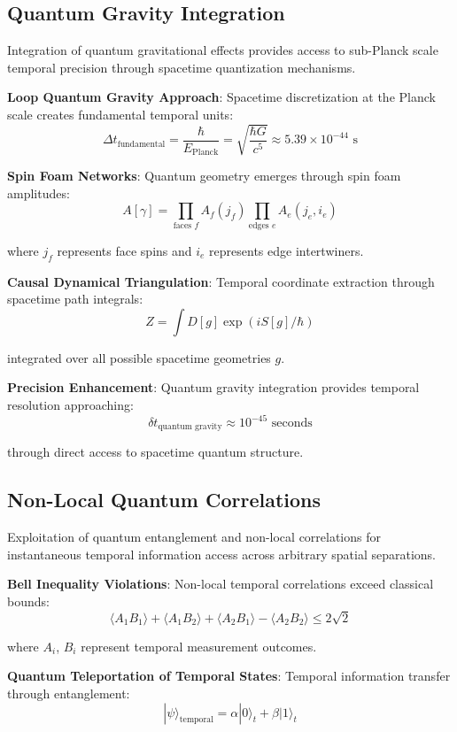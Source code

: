 \documentclass[12pt,a4paper]{article}
\begin{document}
\subsection{Quantum Gravity Integration}

Integration of quantum gravitational effects provides access to sub-Planck scale temporal precision through spacetime quantization mechanisms.

\textbf{Loop Quantum Gravity Approach}: Spacetime discretization at the Planck scale creates fundamental temporal units:
$$\Delta t_{\text{fundamental}} = \frac{\hbar}{E_{\text{Planck}}} = \sqrt{\frac{\hbar G}{c^5}} \approx 5.39 \times 10^{-44} \text{ s}$$

\textbf{Spin Foam Networks}: Quantum geometry emerges through spin foam amplitudes:
$$A[\gamma] = \prod_{\text{faces } f} A_f(j_f) \prod_{\text{edges } e} A_e(j_e,i_e)$$

where $j_f$ represents face spins and $i_e$ represents edge intertwiners.

\textbf{Causal Dynamical Triangulation}: Temporal coordinate extraction through spacetime path integrals:
$$Z = \int D[g] \exp(iS[g]/\hbar)$$

integrated over all possible spacetime geometries $g$.

\textbf{Precision Enhancement}: Quantum gravity integration provides temporal resolution approaching:
$$\delta t_{\text{quantum gravity}} \approx 10^{-45} \text{ seconds}$$

through direct access to spacetime quantum structure.

\subsection{Non-Local Quantum Correlations}

Exploitation of quantum entanglement and non-local correlations for instantaneous temporal information access across arbitrary spatial separations.

\textbf{Bell Inequality Violations}: Non-local temporal correlations exceed classical bounds:
$$\langle A_1 B_1 \rangle + \langle A_1 B_2 \rangle + \langle A_2 B_1 \rangle - \langle A_2 B_2 \rangle \leq 2\sqrt{2}$$

where $A_i$, $B_i$ represent temporal measurement outcomes.

\textbf{Quantum Teleportation of Temporal States}: Temporal information transfer through entanglement:
$$|\psi\rangle_{\text{temporal}} = \alpha|0\rangle_t + \beta|1\rangle_t$$
\end{document}
